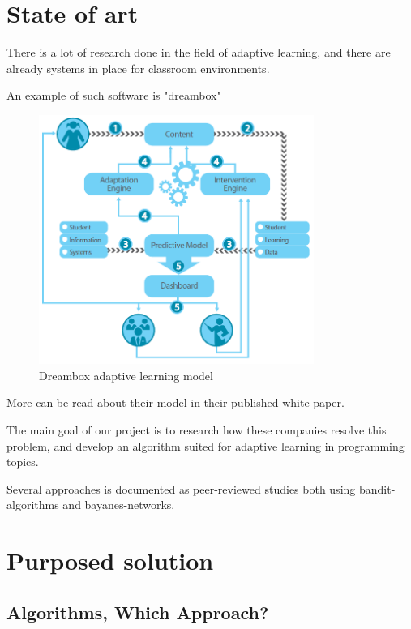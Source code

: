 \clearpage

\section{State of art}
There is a lot of research done in the field of adaptive learning, and there are already systems in place for classroom environments.

An example of such software is "dreambox"
\begin{figure}[!htb]
    \centering
    \includegraphics[width=0.8\textwidth]{./adaptive.png}
    \caption{Dreambox adaptive learning model}
    \label{fig:awesome_image}
\end{figure}

More can be read about their model in their published white paper\cite{website:dreambox}.

The main goal of our project is to research how these companies resolve this problem, and develop an algorithm suited for adaptive learning in programming topics. 

Several approaches is documented as peer-reviewed studies both using bandit-algorithms and bayanes-networks.\cite{baynet}\cite{mabits}


\section{Purposed solution}

\subsection {Algorithms, Which Approach?}

